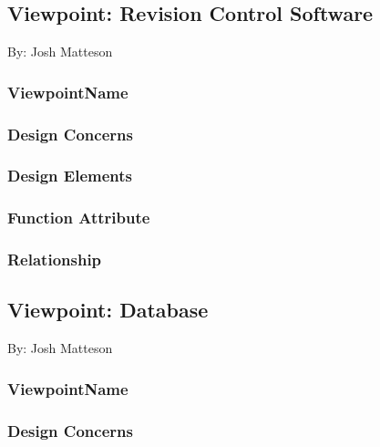 \documentclass[letterpaper, 10pt, draftclsnofoot, compsoc, onecolumn]{IEEEtran}
\begin{document}
\subsection{Viewpoint: Revision Control Software}
{\noindent By: Josh Matteson \par}

\subsubsection{ViewpointName}
{\noindent  \par}

\subsubsection{Design Concerns}
{\noindent  \par}

\subsubsection{Design Elements}
{\noindent  \par}

\subsubsection{Function Attribute}
{\noindent  \par}

\subsubsection{Relationship}


\subsection{Viewpoint: Database}
{\noindent By: Josh Matteson \par}

\subsubsection{ViewpointName}
{\noindent  \par}

\subsubsection{Design Concerns}
{\noindent  \par}
\end{document}
